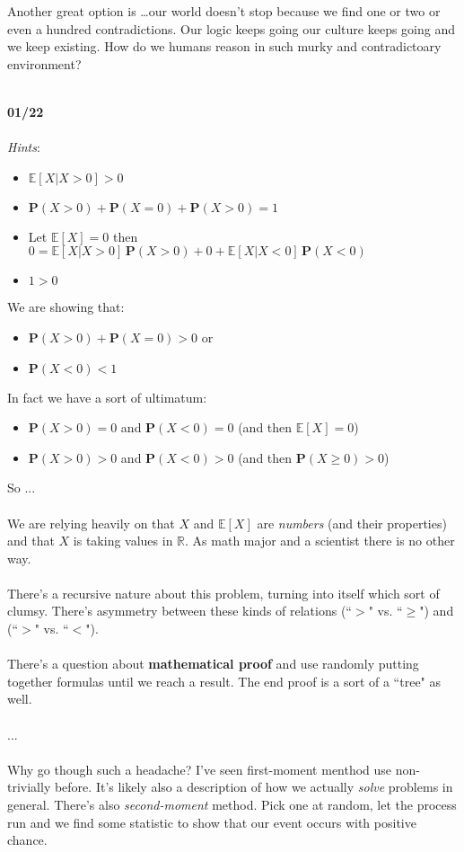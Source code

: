 \documentclass[12pt]{article}
\begin{document}
{Another great option is \dots our world doesn't stop because we find one or two or even a hundred contradictions.  Our logic keeps going our culture keeps going and we keep existing.  How do we humans reason in such murky and contradictoary environment? \\ \\

\newpage

\noindent \textbf{01/22} \\ \\
\textit{Hints}:
\begin{itemize}
\item $\mathbb{E}[X | X > 0] > 0$
\item $\mathbf{P}(X > 0) + \mathbf{P}(X = 0) + \mathbf{P}(X > 0) = 1$
\item Let $\mathbb{E}[X] = 0$ then $0 = \mathbb{E}[X | X > 0]\, \mathbf{P}(X > 0)
+ 0 + \mathbb{E}[X | X < 0]\, \mathbf{P}(X < 0 )$
\item $ 1 > 0$
\end{itemize}
We are showing that:
\begin{itemize}
\item $\mathbf{P}(X > 0) + \mathbf{P}(X = 0) > 0$ or
\item $\mathbf{P}(X < 0) < 1$
\end{itemize}
In fact we have a sort of ultimatum:
\begin{itemize}
\item $\mathbf{P}(X > 0) = 0$ and $\mathbf{P}(X < 0) = 0$ (and then $\mathbb{E}[X] = 0$)
\item $\mathbf{P}(X > 0) > 0$ and $\mathbf{P}(X < 0) > 0$ (and then $\mathbf{P}(X \geq 0) > 0$)
\end{itemize}
So ...  \\ \\
We are relying heavily on that $X$ and $\mathbb{E}[X]$ are \textit{numbers} (and their properties) and that $X$ is taking values in $\mathbb{R}$.  As math major and a scientist there is no other way.  \\ \\
There's a recursive nature about this problem, turning into itself which sort of clumsy.  There's asymmetry between these kinds of relations (``$>$" vs. ``$\geq$") and (``$>$" vs. ``$<$"). \\ \\
There's a question about \textbf{mathematical proof} and use randomly putting together formulas until we reach a result.  The end proof is a sort of a ``tree" as well. \\ \\
... \\ \\
Why go though such a headache?  I've seen first-moment menthod use non-trivially before.  It's likely also a description of how we actually \textit{solve} problems in general.  There's also \textit{second-moment} method. Pick one at random, let the process run and we find some statistic to show that our event occurs with positive chance. 
\newpage

}
\end{document}

